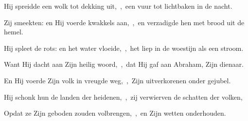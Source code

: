 \documentclass[12pt,twoside,a5paper]{article}
\begin{document}
\begin{halfparskip}
  Hij spreidde een wolk tot dekking uit,~\sep\ een vuur tot lichtbaken in de nacht.

  Zij smeekten: en Hij voerde kwakkels aan,~\sep\ en verzadigde hen met brood uit de hemel.

  Hij spleet de rots: en het water vloeide,~\sep\ het liep in de woestijn als een stroom.

  Want Hij dacht aan Zijn heilig woord,~\sep\ dat Hij gaf aan Abraham, Zijn dienaar.

  En Hij voerde Zijn volk in vreugde weg,~\sep\ Zijn uitverkorenen onder gejubel.

  Hij schonk hun de landen der heidenen,~\sep\ zij verwierven de schatten der volken,

  Opdat ze Zijn geboden zouden volbrengen,~\sep\ en Zijn wetten onderhouden.
\end{halfparskip}
\end{document}
